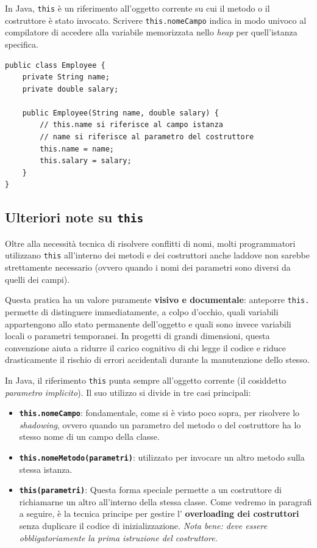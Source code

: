 In Java, \texttt{this} è un riferimento all'oggetto corrente su cui il metodo o il costruttore è stato invocato. Scrivere \texttt{this.nomeCampo} indica in modo univoco al compilatore di accedere alla variabile memorizzata nello \textit{heap} per quell'istanza specifica.

\begin{lstlisting}[caption={Uso di this nel costruttore}]
public class Employee {
    private String name;
    private double salary;

    public Employee(String name, double salary) {
        // this.name si riferisce al campo istanza
        // name si riferisce al parametro del costruttore
        this.name = name;
        this.salary = salary;
    }
}
\end{lstlisting}

\subsection{Ulteriori note su \texttt{this}}
Oltre alla necessità tecnica di risolvere conflitti di nomi, molti programmatori utilizzano \texttt{this} all'interno dei metodi e dei costruttori anche laddove non sarebbe strettamente necessario (ovvero quando i nomi dei parametri sono diversi da quelli dei campi).

Questa pratica ha un valore puramente \textbf{visivo e documentale}: anteporre \texttt{this.} permette di distinguere immediatamente, a colpo d'occhio, quali variabili appartengono allo stato permanente dell'oggetto e quali sono invece variabili locali o parametri temporanei. In progetti di grandi dimensioni, questa convenzione aiuta a ridurre il carico cognitivo di chi legge il codice e riduce drasticamente il rischio di errori accidentali durante la manutenzione dello stesso.


In Java, il riferimento \texttt{this} punta sempre all'oggetto corrente (il cosiddetto \textit{parametro implicito}). Il suo utilizzo si divide in tre casi principali:
\begin{itemize}
    \item \textbf{\texttt{this.nomeCampo}}: fondamentale, come si è visto poco sopra, per risolvere lo \textit{shadowing}, ovvero quando un parametro del metodo o del costruttore ha lo stesso nome di un campo della classe.
    \item \textbf{\texttt{this.nomeMetodo(parametri)}}: utilizzato per invocare un altro metodo sulla stessa istanza.
    \item \textbf{\texttt{this(parametri)}}: Questa forma speciale permette a un costruttore di richiamarne un altro all'interno della stessa classe. Come vedremo in paragrafi a seguire, è la tecnica principe per gestire l' \textbf{overloading dei costruttori} senza duplicare il codice di inizializzazione. \textit{Nota bene: deve essere obbligatoriamente la prima istruzione del costruttore.}
\end{itemize}

